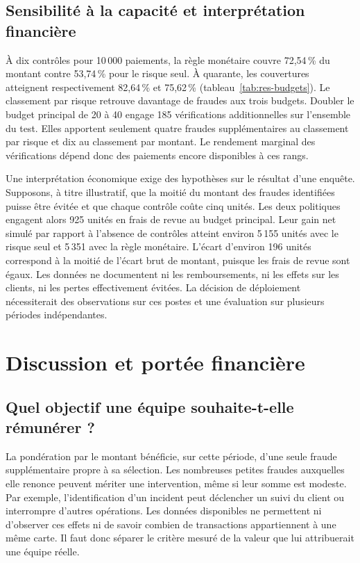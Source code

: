 \documentclass[11pt,a4paper]{article}
\begin{document}
\subsection{Sensibilité à la capacité et interprétation financière}

À dix contrôles pour 10\,000 paiements, la règle monétaire couvre 72,54\,\% du montant contre 53,74\,\% pour le risque seul. À quarante, les couvertures atteignent respectivement 82,64\,\% et 75,62\,\% (tableau~\ref{tab:res-budgets}). Le classement par risque retrouve davantage de fraudes aux trois budgets. Doubler le budget principal de 20 à 40 engage 185 vérifications additionnelles sur l'ensemble du test. Elles apportent seulement quatre fraudes supplémentaires au classement par risque et dix au classement par montant. Le rendement marginal des vérifications dépend donc des paiements encore disponibles à ces rangs.

Une interprétation économique exige des hypothèses sur le résultat d'une enquête. Supposons, à titre illustratif, que la moitié du montant des fraudes identifiées puisse être évitée et que chaque contrôle coûte cinq unités. Les deux politiques engagent alors 925 unités en frais de revue au budget principal. Leur gain net simulé par rapport à l'absence de contrôles atteint environ 5\,155 unités avec le risque seul et 5\,351 avec la règle monétaire. L'écart d'environ 196 unités correspond à la moitié de l'écart brut de montant, puisque les frais de revue sont égaux. Les données ne documentent ni les remboursements, ni les effets sur les clients, ni les pertes effectivement évitées. La décision de déploiement nécessiterait des observations sur ces postes et une évaluation sur plusieurs périodes indépendantes.
\par\medskip
\section{Discussion et portée financière}\label{sec:discussion}

\subsection{Quel objectif une équipe souhaite-t-elle rémunérer ?}
La pondération par le montant bénéficie, sur cette période, d'une seule fraude supplémentaire propre à sa sélection. Les nombreuses petites fraudes auxquelles elle renonce peuvent mériter une intervention, même si leur somme est modeste. Par exemple, l'identification d'un incident peut déclencher un suivi du client ou interrompre d'autres opérations. Les données disponibles ne permettent ni d'observer ces effets ni de savoir combien de transactions appartiennent à une même carte. Il faut donc séparer le critère mesuré de la valeur que lui attribuerait une équipe réelle.
\end{document}
